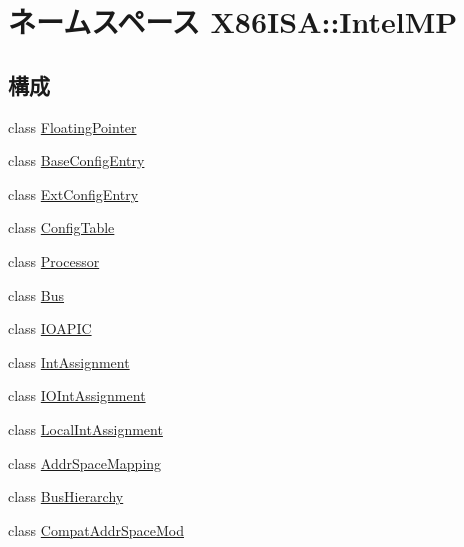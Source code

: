 \hypertarget{namespaceX86ISA_1_1IntelMP}{
\section{ネームスペース X86ISA::IntelMP}
\label{namespaceX86ISA_1_1IntelMP}
}
\subsection*{構成}
\begin{DoxyCompactItemize}
\item 
class \hyperlink{classX86ISA_1_1IntelMP_1_1FloatingPointer}{FloatingPointer}
\item 
class \hyperlink{classX86ISA_1_1IntelMP_1_1BaseConfigEntry}{BaseConfigEntry}
\item 
class \hyperlink{classX86ISA_1_1IntelMP_1_1ExtConfigEntry}{ExtConfigEntry}
\item 
class \hyperlink{classX86ISA_1_1IntelMP_1_1ConfigTable}{ConfigTable}
\item 
class \hyperlink{classX86ISA_1_1IntelMP_1_1Processor}{Processor}
\item 
class \hyperlink{classX86ISA_1_1IntelMP_1_1Bus}{Bus}
\item 
class \hyperlink{classX86ISA_1_1IntelMP_1_1IOAPIC}{IOAPIC}
\item 
class \hyperlink{classX86ISA_1_1IntelMP_1_1IntAssignment}{IntAssignment}
\item 
class \hyperlink{classX86ISA_1_1IntelMP_1_1IOIntAssignment}{IOIntAssignment}
\item 
class \hyperlink{classX86ISA_1_1IntelMP_1_1LocalIntAssignment}{LocalIntAssignment}
\item 
class \hyperlink{classX86ISA_1_1IntelMP_1_1AddrSpaceMapping}{AddrSpaceMapping}
\item 
class \hyperlink{classX86ISA_1_1IntelMP_1_1BusHierarchy}{BusHierarchy}
\item 
class \hyperlink{classX86ISA_1_1IntelMP_1_1CompatAddrSpaceMod}{CompatAddrSpaceMod}
\end{DoxyCompactItemize}
